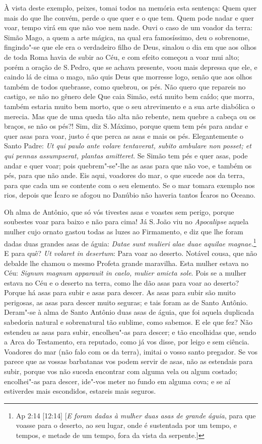 À vista deste exemplo, peixes, tomai todos na memória esta sentença:
Quem quer mais do que lhe convém, perde o que quer e o que tem. Quem
pode nadar e quer voar, tempo virá em que não voe nem nade. Ouvi o caso
de um voador da terra: Simão Mago, a quem a arte mágica, na qual era
famosíssimo, deu o sobrenome, fingindo"-se que ele era o verdadeiro filho
de Deus, sinalou o dia em que aos olhos de toda Roma havia de subir ao
Céu, e com efeito começou a voar mui alto; porém a oração de S.\,Pedro,
que se achava presente, voou mais depressa que
ele, e caindo lá de cima o mago, não quis Deus que morresse logo, senão
que aos olhos também de todos quebrasse, como quebrou, os pés.
Não quero que repareis no castigo, se não no gênero dele Que caia Simão,
está muito bem caído; que morra, também estaria muito bem morto, que o
seu atrevimento e a sua arte diabólica o merecia. Mas que de uma queda
tão alta não rebente, nem quebre a cabeça ou os braços, se não os pés?!
Sim, diz S.\,Máximo, porque quem tem pés para andar e quer asas para
voar, justo é que perca as asas e mais os pés. Elegantemente o Santo
Padre: \emph{Ut qui paulo ante volare tentaverat, subito ambulare non
posset; et qui pennas assumpserat, plantas amitteret}. Se Simão tem pés
e quer asas, pode andar e quer voar; pois quebrem"-se"-lhe as asas para
que não voe, e também os pés, para que não ande. Eis aqui, voadores do
mar, o que sucede aos da terra, para que cada um se contente com o seu
elemento. Se o mar tomara exemplo nos rios, depois que Ícaro se afogou
no Danúbio não haveria tantos Ícaros no Oceano.

Oh alma de Antônio, que só vós tivestes asas e voastes sem perigo,
porque soubestes voar para baixo e não para cima! Já S.\,João viu no
\emph{Apocalipse} aquela mulher cujo ornato gastou todas as luzes ao
Firmamento, e diz que lhe foram dadas duas grandes asas de águia:
\emph{Datae sunt mulieri alae duae aquilae magnae.}\footnote{Ap 2:14 [12:14] [\emph{E foram dadas à mulher duas asas de grande águia}, para que voasse para o deserto, ao seu lugar, onde é sustentada por um tempo, e tempos, e metade de um tempo, fora da vista da serpente.]} E para quê? \emph{Ut
volaret in desertum}: Para voar ao deserto. Notável cousa, que não
debalde lhe chamou o mesmo Profeta grande maravilha. Esta mulher estava
no Céu: \emph{Signum magnum apparauit in caelo, mulier amicta sole}.
Pois se a mulher estava no Céu e o deserto na terra, como lhe dão asas
para voar ao deserto? Porque há asas para subir e asas para descer. As
asas para subir são muito perigosas, as asas para descer muito seguras;
e tais foram as de Santo Antônio. Deram"-se à alma de Santo Antônio duas
asas de águia, que foi aquela duplicada sabedoria natural e sobrenatural
tão sublime, como sabemos. E ele que fez? Não estendeu as asas para
subir, encolheu"-as para descer; e tão encolhidas que, sendo a Arca do
Testamento, era reputado, como já vos disse, por leigo e sem ciência.
Voadores do mar (não falo com os da terra), imitai o vosso santo
pregador. Se vos parece que as vossas barbatanas vos podem servir de
asas, não as estendais para subir, porque vos não suceda encontrar com
alguma vela ou algum costado; encolhei"-as para descer, ide"-vos meter no
fundo em alguma cova; e se aí estiverdes mais escondidos, estareis mais
seguros.

